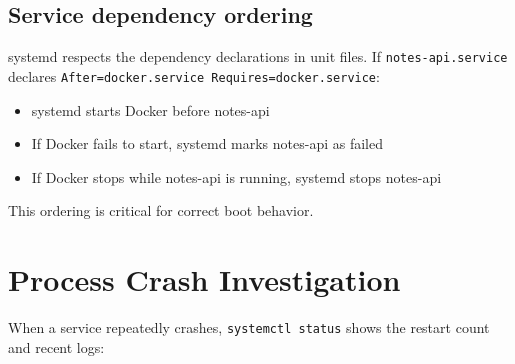 \begin{codebox}[short]

\begin{Shaded}
\begin{Highlighting}[]
 
 

 
\end{Highlighting}
\end{Shaded}

\end{codebox}

\subsection*{Service dependency ordering}\label{25-process-management:service-dependency-ordering}

systemd respects the dependency declarations in unit files. If \texttt{notes-api.service} declares \texttt{After=}\allowbreak{}\texttt{docker.}\allowbreak{}\texttt{service\ Requires=}\allowbreak{}\texttt{docker.}\allowbreak{}\texttt{service}:

\begin{itemize}
\tightlist
\item
  systemd starts Docker before notes-api
\item
  If Docker fails to start, systemd marks notes-api as failed
\item
  If Docker stops while notes-api is running, systemd stops notes-api
\end{itemize}

\noindent{}This ordering is critical for correct boot behavior.

\setcounter{section}{5}
\section{Process Crash Investigation}\label{25-process-management:256-process-crash-investigation}

When a service repeatedly crashes, \texttt{systemctl\ status} shows the restart count and recent logs:

